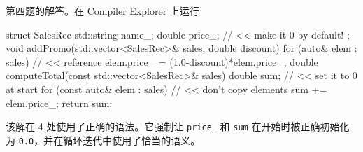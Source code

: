 第四题的解答。在 Compiler Explorer 上运行

\begin{codebox}[cpp]
struct SalesRec {
std::string name_;
double price_{}; // << make it 0 by default!
};
void addPromo(std::vector<SalesRec>& sales, double discount) {
for (auto& elem : sales)
// << reference
elem.price_ = (1.0-discount)*elem.price_;
}
double computeTotal(const std::vector<SalesRec>& sales) {
double sum{}; // << set it to 0 at start
for (const auto& elem : sales) // << don't copy elements
sum += elem.price_;
return sum;
}
\end{codebox}

该解在 4 处使用了正确的语法。它强制让 \texttt{price\_} 和 \texttt{sum} 在开始时被正确初始化为 \texttt{0.0}，并在循环迭代中使用了恰当的语义。
